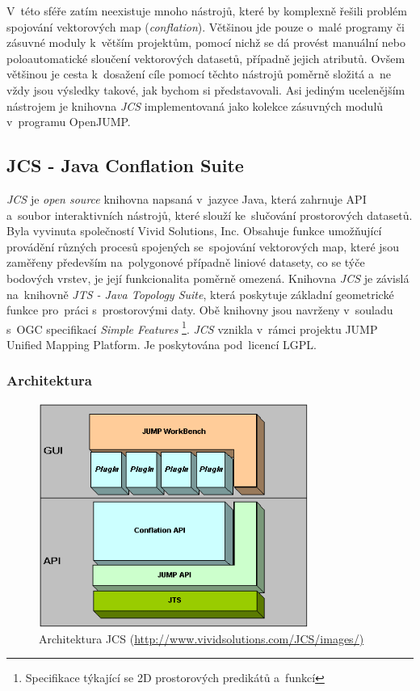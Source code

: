 V~této sféře zatím neexistuje mnoho nástrojů, které by komplexně řešili problém
spojování vektorových map (\textit{conflation}). Většinou jde pouze o~malé 
programy či zásuvné moduly k~větším projektům, pomocí nichž se dá provést manuální
nebo poloautomatické sloučení vektorových datasetů, případně jejich atributů. 
Ovšem většinou je cesta k~dosažení cíle pomocí těchto nástrojů poměrně složitá 
a~ne vždy jsou výsledky takové, jak bychom si představovali. Asi jediným 
ucelenějším nástrojem je knihovna \textit{JCS} implementovaná jako kolekce 
zásuvných modulů v~programu OpenJUMP.

\subsection{JCS - Java Conflation Suite}
\label{JCS}

\textit{JCS} je \textit{open source} knihovna napsaná v~jazyce Java, která 
zahrnuje API a~soubor interaktivních nástrojů, které slouží ke~slučování 
prostorových datasetů. Byla vyvinuta společností Vivid Solutions, Inc. 
Obsahuje funkce umožňující provádění různých procesů spojených se~spojování
vektorových map, které jsou zaměřeny především na~polygonové případně liniové
datasety, co se týče bodových vrstev, je její funkcionalita poměrně omezená. 
Knihovna \textit{JCS} je závislá na~knihovně \textit{JTS - Java Topology Suite},
která poskytuje základní geometrické funkce pro~práci s~prostorovými
daty. Obě knihovny jsou navrženy v~souladu s~OGC specifikací 
\textit{Simple Features} \footnote{Specifikace týkající se 2D prostorových 
predikátů a~funkcí}. \textit{JCS} vznikla v~rámci projektu JUMP Unified 
Mapping Platform. Je poskytována pod~licencí LGPL.

\subsubsection{Architektura}
\label{jcspic}
  \begin{figure}[hbt]
    \centering
      \includegraphics[width=250pt]{./pictures/JCS_Architecture.png}
      \caption{Architektura JCS 
	  (\url{http://www.vividsolutions.com/JCS/images/)}}
      \label{fig:architektura}
  \end{figure}


